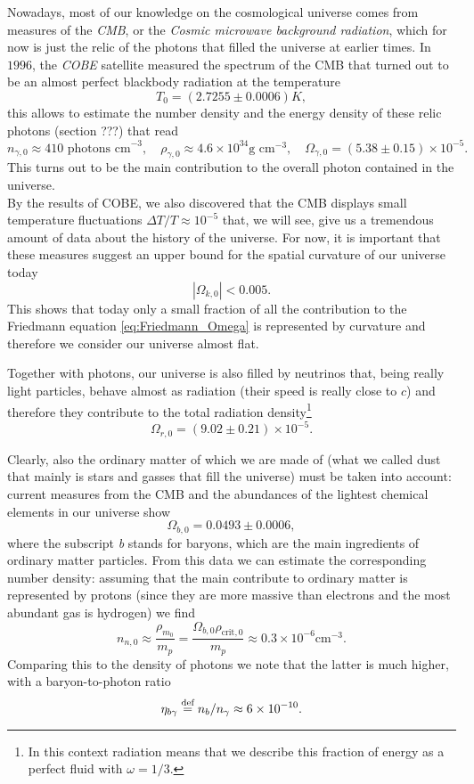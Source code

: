 Nowadays, most of our knowledge on the cosmological universe comes from measures of the \emph{CMB}, or the \emph{Cosmic microwave background radiation}, which for now is just the relic of the photons that filled the universe at earlier times. In $1996$, the \emph{COBE} satellite \cite{COBE1996} measured the spectrum of the CMB that turned out to be an almost perfect blackbody radiation at the temperature 
\begin{equation}
    \label{eq:T0_CMB}
    T_0=(2.7255\pm0.0006)K,
\end{equation}
this allows to estimate the number density and the energy density of these relic photons (section ???) that read
$$n_{\gamma,0}\approx410\text{ photons cm}^{-3},\quad \rho_{\gamma, 0}\approx4.6\times10^{34}\text{g cm}^{-3},\quad\Omega_{\gamma,0}=(5.38\pm0.15)\times10^{-5}.$$
This turns out to be the main contribution to the overall photon contained in the universe.\\
By the results of COBE, we also discovered that the CMB displays small temperature fluctuations $\Delta T/T\approx 10^{-5}$ that, we will see, give us a tremendous amount of data about the history of the universe. For now, it is important that these measures suggest an upper bound for the spatial curvature of our universe today
\begin{equation}
    \label{eq:Omega_k0}|\Omega_{k,0}|<0.005.
\end{equation}
This shows that today only a small fraction of all the contribution to the Friedmann equation \eqref{eq:Friedmann_Omega} is represented by curvature and therefore we consider our universe almost flat. 

Together with photons, our universe is also filled by neutrinos that, being really light particles, behave almost as radiation (their speed is really close to $c$) and therefore they contribute to the total radiation density\footnote{In this context radiation means that we describe this fraction of energy as a perfect fluid with $\omega=1/3$.} $$\Omega_{r,0}=(9.02\pm0.21)\times10^{-5}.$$  

Clearly, also the ordinary matter of which we are made of (what we called dust that mainly is stars and gasses that fill the universe) must be taken into account: current measures from the CMB and the abundances of the lightest chemical elements in our universe show $$\Omega_{b,0}=0.0493\pm0.0006,$$
where the subscript \emph{b} stands for baryons, which are the main ingredients of ordinary matter particles.
From this data we can estimate the corresponding number density: assuming that the main contribute to ordinary matter is represented by protons (since they are more massive than electrons and the most abundant gas is hydrogen) we find $$n_{n,0}\approx\frac{\rho_{m_0}}{m_p}=\frac{\Omega_{b,0}\rho_{\text{crit},0}}{m_p}\approx0.3\times10^{-6}\text{cm}^{-3}.$$ Comparing this to the density of photons we note that the latter is much higher, with a baryon-to-photon ratio
\begin{equation}
    \label{eq:baryon-to.photon_ratio}
    \eta_{b\gamma}\stackrel{\text{def}}{=} n_b/n_\gamma\approx6\times10^{-10}.
\end{equation}

